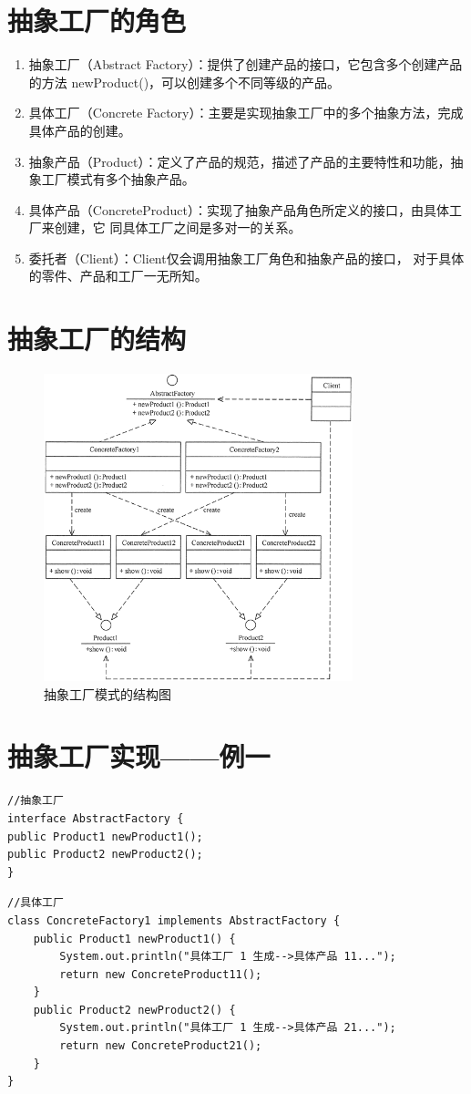 \section{抽象工厂的角色}
\begin{enumerate}
	\item 抽象工厂（Abstract Factory）：提供了创建产品的接口，它包含多个创建产品的方法 newProduct()，可以创建多个不同等级的产品。
	\item 具体工厂（Concrete Factory）：主要是实现抽象工厂中的多个抽象方法，完成具体产品的创建。
	\item 抽象产品（Product）：定义了产品的规范，描述了产品的主要特性和功能，抽象工厂模式有多个抽象产品。
	\item 具体产品（ConcreteProduct）：实现了抽象产品角色所定义的接口，由具体工厂来创建，它 同具体工厂之间是多对一的关系。
	\item 委托者（Client）：Client仅会调用抽象工厂角色和抽象产品的接口，
	对于具体的零件、产品和工厂一无所知。
\end{enumerate}
\section{抽象工厂的结构}
\begin{figure}
	\centering
	\includegraphics[width=0.8\textwidth]{image/8-2}
	\caption{抽象工厂模式的结构图}
\end{figure}
\section{抽象工厂实现——例一}
\begin{lstlisting}
//抽象工厂
interface AbstractFactory {
public Product1 newProduct1();
public Product2 newProduct2();
}
\end{lstlisting}
\begin{lstlisting}
//具体工厂
class ConcreteFactory1 implements AbstractFactory {
	public Product1 newProduct1() {
		System.out.println("具体工厂 1 生成-->具体产品 11...");
		return new ConcreteProduct11();
	}
	public Product2 newProduct2() {
		System.out.println("具体工厂 1 生成-->具体产品 21...");
		return new ConcreteProduct21();
	}
}
\end{lstlisting}
